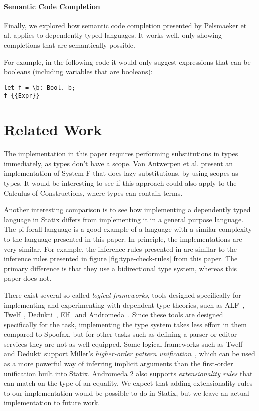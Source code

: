 \documentclass[a4paper,UKenglish,cleveref, autoref, thm-restate]{oasics-v2021}
\begin{document}
\paragraph*{Semantic Code Completion}
Finally, we explored how semantic code completion presented by Pelsmaeker et al. \cite{codecompletion} applies to dependently typed languages. It works well, only showing completions that are semantically possible.

For example, in the following code it would only suggest expressions that can be booleans (including variables that are booleans):
\begin{lstlisting}
let f = \b: Bool. b;
f {{Expr}}
\end{lstlisting}


\section{Related Work}
The implementation in this paper requires performing substitutions in types immediately, as types don't have a scope. Van Antwerpen et al. \cite[sect 2.5]{scopes_as_types} present an implementation of System F that does lazy substitutions, by using scopes as types. It would be interesting to see if this approach could also apply to the Calculus of Constructions, where types can contain terms. 

Another interesting comparison is to see how implementing a dependently typed language in Statix differs from implementing it in a general purpose language. The pi-forall language\cite{pi_forall} is a good example of a language with a similar complexity to the language presented in this paper. In principle, the implementations are very similar. For example, the inference rules presented in \cite{pi_forall} are similar to the inference rules presented in figure \ref{fig:type-check-rules} from this paper. The primary difference is that they use a bidirectional type system, whereas this paper does not.

There exist several so-called \emph{logical frameworks}, tools designed specifically for implementing and experimenting with dependent type theories, such as ALF~\cite{MagnussonN93}, Twelf~\cite{PfenningS99}, Dedukti~\cite{BoespflugCH12}, Elf~\cite{pfenning_1991} and Andromeda~\cite{BauerHP20}. Since these tools are designed specifically for the task, implementing the type system takes less effort in them compared to Spoofax, but for other tasks such as defining a parser or editor services they are not as well equipped. Some logical frameworks such as Twelf and Dedukti support Miller's \emph{higher-order pattern unification}~\cite{Miller89}, which can be used as a more powerful way of inferring implicit arguments than the first-order unification built into Statix. Andromeda 2 also supports \emph{extensionality rules} that can match on the type of an equality. We expect that adding extensionality rules to our implementation would be possible to do in Statix, but we leave an actual implementation to future work.
\end{document}

